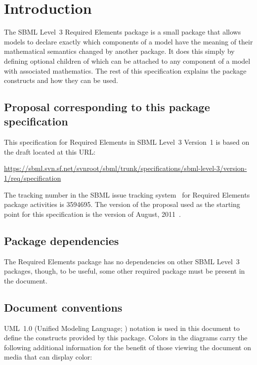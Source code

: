 
\section{Introduction}
\label{intro}

The SBML Level~3 Required Elements package is a small package that allows models to declare exactly which components of a model have the meaning of their mathematical semantics changed by another package.  It does this simply by defining optional children of \SBase which can be attached to any component of a model with associated mathematics.  The rest of this specification explains the package constructs and how they can be used.


\subsection{Proposal corresponding to this package specification}

This specification for Required Elements in SBML Level~3 Version~1 is based on the draft located at this URL:

\begin{center}
  \vspace*{1ex}\small
  \url{https://sbml.svn.sf.net/svnroot/sbml/trunk/specifications/sbml-level-3/version-1/req/specification}
  \vspace*{1ex}
\end{center}

The tracking number in the SBML issue tracking system~\citep{tracker} for Required Elements package activities is 3594695.  The version of the proposal used as the starting point for this specification is the version of August, 2011~\citep{req_proposal_2011}.


\subsection{Package dependencies}

The Required Elements package has no dependencies on other SBML Level~3 packages, though, to be useful, some other required package must be present in the document.


\subsection{Document conventions}
\label{conventions}

UML~1.0 (Unified Modeling Language; \citealt{eriksson:1998, oestereich:1999}) notation is used in this document to define the constructs provided by this package.  Colors in the diagrams carry the following additional information for the benefit of those viewing the document on media that can display color:

